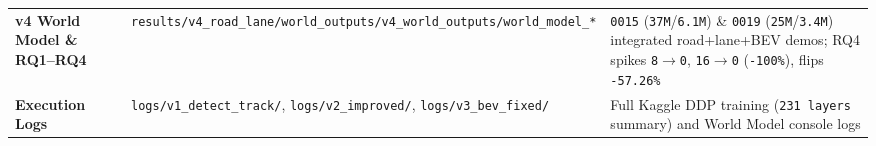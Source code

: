 \documentclass[10.5pt,a4paper]{article}
\begin{document}
\begin{footnotesize}
\begin{longtable}{>{\raggedright\arraybackslash}p{} >{\raggedright\arraybackslash}p{} >{\raggedright\arraybackslash}p{}}
\textbf{v4 World Model \& RQ1--RQ4} & \texttt{results/\allowbreak{}v4\_\allowbreak{}road\_\allowbreak{}lane/\allowbreak{}world\_\allowbreak{}outputs/\allowbreak{}v4\_\allowbreak{}world\_\allowbreak{}outputs/\allowbreak{}world\_\allowbreak{}model\_\allowbreak{}*} & \texttt{0015} (\texttt{37M}/\texttt{6.\allowbreak{}1M}) \& \texttt{0019} (\texttt{25M}/\texttt{3.\allowbreak{}4M}) integrated road+lane+BEV demos; RQ4 spikes \texttt{8$\rightarrow$0}, \texttt{16$\rightarrow$0} (\texttt{-\allowbreak{}100\%}), flips \texttt{-\allowbreak{}57.\allowbreak{}26\%} \\
\textbf{Execution Logs} & \texttt{logs/\allowbreak{}v1\_\allowbreak{}detect\_\allowbreak{}track/\allowbreak{}}, \texttt{logs/\allowbreak{}v2\_\allowbreak{}improved/\allowbreak{}}, \texttt{logs/\allowbreak{}v3\_\allowbreak{}bev\_\allowbreak{}fixed/\allowbreak{}} & Full Kaggle DDP training (\texttt{231 layers} summary) and World Model console logs \\
\end{longtable}
\end{footnotesize}
\end{document}
